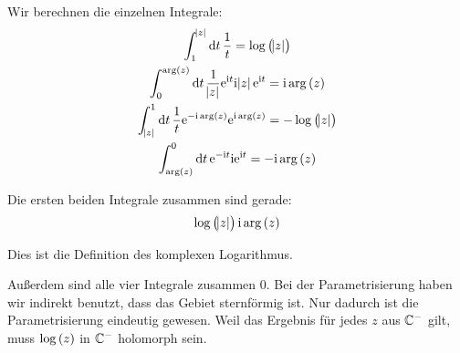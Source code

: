 Wir berechnen die einzelnen Integrale:
\begin{gather*}
	\int_1^{\abs{z}} \dif t \, \frac 1t = \log\del{\abs{z}} \\
	\int_0^{\arg\del{z}} \dif t \, \frac 1{\abs{z}} \ee^{\ii t} \ii \abs{z} \ee^{\ii t} = \ii \arg\del{z} \\
	\int_{\abs{z}}^1 \dif t \, \frac 1t \ee^{-\ii \arg\del{z}} \ee^{\ii \arg\del{z}} = - \log\del{ \abs{z}} \\
	\int_{\arg\del{z}}^0 \dif t \, \ee^{-\ii t} \ii \ee^{\ii t} = - \ii \arg\del{z}
\end{gather*}

Die ersten beiden Integrale zusammen sind gerade:
\[
	\log\del{\abs{z}}
	\ii \arg\del{z}
\]

Dies ist die Definition des komplexen Logarithmus.

Außerdem sind alle vier Integrale zusammen 0. Bei der Parametrisierung haben
wir indirekt benutzt, dass das Gebiet sternförmig ist. Nur dadurch ist die
Parametrisierung eindeutig gewesen. Weil das Ergebnis für jedes $z$ aus $\mathbb C^-$
gilt, muss $\log\del z$ in $\mathbb C^-$ holomorph sein.

%
%



